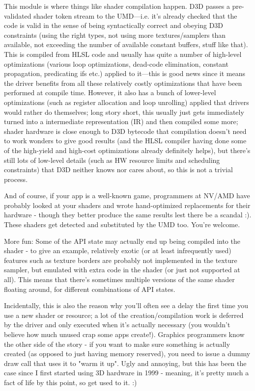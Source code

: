 This module is where things like shader compilation happen. D3D passes a
pre-validated shader token stream to the UMD---i.e. it's already checked that
the code is valid in the sense of being syntactically correct and obeying D3D
constraints (using the right types, not using more textures/samplers than
available, not exceeding the number of available constant buffers, stuff like
that). This is compiled from HLSL code and usually has quite a number of
high-level optimizations (various loop optimizations, dead-code elimination,
constant propagation, predicating ifs etc.) applied to it---this is good news
since it means the driver benefits from all these relatively costly
optimizations that have been performed at compile time. However, it also has a
bunch of lower-level optimizations (such as register allocation and loop
unrolling) applied that drivers would rather do themselves; long story short,
this usually just gets immediately turned into a intermediate representation
(IR) and then compiled some more; shader hardware is close enough to D3D
bytecode that compilation doesn't need to work wonders to give good results
(and the HLSL compiler having done some of the high-yield and high-cost
optimizations already definitely helps), but there's still lots of low-level
details (such as HW resource limits and scheduling constraints) that D3D
neither knows nor cares about, so this is not a trivial process.

And of course, if your app is a well-known game, programmers at NV/AMD have
probably looked at your shaders and wrote hand-optimized replacements for their
hardware - though they better produce the same results lest there be a scandal
:). These shaders get detected and substituted by the UMD too. You're welcome.

More fun: Some of the API state may actually end up being compiled into the
shader - to give an example, relatively exotic (or at least infrequently used)
features such as texture borders are probably not implemented in the texture
sampler, but emulated with extra code in the shader (or just not supported at
all). This means that there's sometimes multiple versions of the same shader
floating around, for different combinations of API states.

Incidentally, this is also the reason why you'll often see a delay the first
time you use a new shader or resource; a lot of the creation/compilation work
is deferred by the driver and only executed when it's actually necessary (you
wouldn't believe how much unused crap some apps create!). Graphics programmers
know the other side of the story - if you want to make sure something is
actually created (as opposed to just having memory reserved), you need to issue
a dummy draw call that uses it to "warm it up". Ugly and annoying, but this has
been the case since I first started using 3D hardware in 1999 - meaning, it's
pretty much a fact of life by this point, so get used to it. :)

